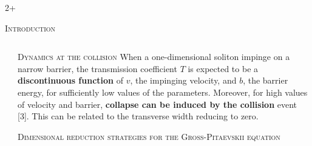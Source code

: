 \documentclass[final]{beamer}
\newlength{\sepwidth}
\newlength{\colwidth}
\newcommand{\separatorcolumn}{\begin{column}{\sepwidth}\end{column}}
\begin{document}
\begin{frame}[t]
\begin{columns}[t]
\begin{column}{2\colwidth+\sepwidth}
\begin{block}{\textsc{Introduction}}
  \end{block}
  \end{column}
  \end{columns}


  \begin{columns}[t]
    \separatorcolumn
    \begin{column}{\colwidth}
      
      \begin{block}{\textsc{Dynamics at the collision}}
        When a one-dimensional soliton impinge on a narrow barrier, the transmission coefficient $T$ is expected to be a \textbf{discontinuous function} of $v$, the impinging velocity, and $b$, the barrier energy, for sufficiently low values of the parameters. Moreover, for high values of velocity and barrier, \textbf{collapse can be induced by the collision} event [3]. This can be related to the transverse width reducing to zero.  
        \begin{figure}
          \hspace{2cm}
      \end{figure}
      \end{block}

      \begin{block}{\textsc{Dimensional reduction strategies for the Gross-Pitaevskii equation}}{}
        

\end{block}
\end{column}
\end{columns}
\end{frame}
\end{document}
